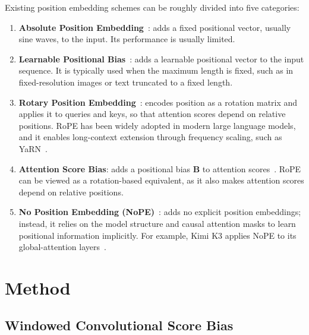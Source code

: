 \documentclass{article}
\begin{document}
Existing position embedding schemes can be roughly divided into five categories:

\begin{enumerate}
    \item \textbf{Absolute Position Embedding}~\cite{vaswani2017attention}: adds a fixed positional vector, usually sine waves, to the input. Its performance is usually limited.
    \item \textbf{Learnable Positional Bias}~\cite{devlin2019bert,radford2019language}: adds a learnable positional vector to the input sequence. It is typically used when the maximum length is fixed, such as in fixed-resolution images or text truncated to a fixed length.
    \item \textbf{Rotary Position Embedding}~\cite{su2021roformer}: encodes position as a rotation matrix and applies it to queries and keys, so that attention scores depend on relative positions. RoPE has been widely adopted in modern large language models, and it enables long-context extension through frequency scaling, such as YaRN~\cite{peng2024yarn}.
    \item \textbf{Attention Score Bias}: adds a positional bias $\mathbf{B}$ to attention scores~\cite{raffel2020exploring,press2021train,chang2021convolutionsselfattentionreinterpretingrelative}. RoPE can be viewed as a rotation-based equivalent, as it also makes attention scores depend on relative positions.
    \item \textbf{No Position Embedding (NoPE)}~\cite{kazemnejad2023impact}: adds no explicit position embeddings; instead, it relies on the model structure and causal attention masks to learn positional information implicitly. For example, Kimi K3 applies NoPE to its global-attention layers~\cite{kimi2026k3}.
\end{enumerate}

\section{Method}
\label{sec:method}

\subsection{Windowed Convolutional Score Bias}
\end{document}
